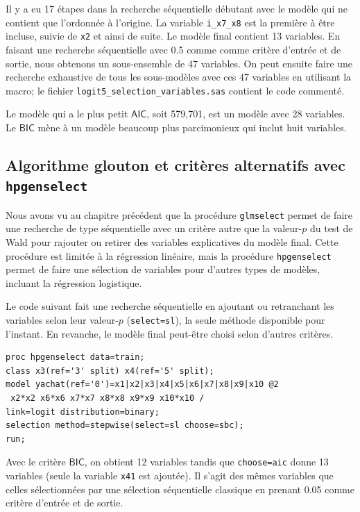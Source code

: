 \documentclass[
  11pt,
  letterpaper,
]{book}
\theoremstyle{definition}
\theoremstyle{definition}
\theoremstyle{definition}
\theoremstyle{remark}
\begin{document}
Il y a eu 17 étapes dans la recherche séquentielle débutant avec le modèle qui ne contient que l'ordonnée à l'origine. La variable \texttt{i\_x7\_x8} est la première à être incluse, suivie de \texttt{x2} et ainsi de suite. Le modèle final contient 13 variables.
En faisant une recherche séquentielle avec 0.5 comme comme critère d'entrée et de sortie, nous obtenons un sous-ensemble de 47 variables. On peut ensuite faire une recherche exhaustive de tous les sous-modèles avec ces 47 variables en utilisant la macro; le fichier \texttt{logit5\_selection\_variables.sas} contient le code commenté.

Le modèle qui a le plus petit \(\mathsf{AIC}\), soit 579,701, est un modèle avec 28 variables. Le \(\mathsf{BIC}\) mène à un modèle beaucoup plus parcimonieux qui inclut huit variables.

\hypertarget{algorithme-glouton-et-crituxe8res-alternatifs-avec-hpgenselect}{%
\subsection{\texorpdfstring{Algorithme glouton et critères alternatifs avec \texttt{hpgenselect}}{Algorithme glouton et critères alternatifs avec hpgenselect}}\label{algorithme-glouton-et-crituxe8res-alternatifs-avec-hpgenselect}}

Nous avons vu au chapitre précédent que la procédure \texttt{glmselect} permet de faire une recherche de type séquentielle avec un critère autre que la valeur-\(p\) du test de Wald pour rajouter ou retirer des variables explicatives du modèle final. Cette procédure est limitée à la régression linéaire, mais la procédure \texttt{hpgenselect} permet de faire une sélection de variables pour d'autres types de modèles, incluant la régression logistique.

Le code suivant fait une recherche séquentielle en ajoutant ou retranchant les variables selon leur valeur-\(p\) (\texttt{select=sl}), la seule méthode disponible pour l'instant. En revanche, le modèle final peut-être choisi selon d'autres critères.

\begin{verbatim}
proc hpgenselect data=train;
class x3(ref='3' split) x4(ref='5' split);
model yachat(ref='0')=x1|x2|x3|x4|x5|x6|x7|x8|x9|x10 @2 
 x2*x2 x6*x6 x7*x7 x8*x8 x9*x9 x10*x10 /  
link=logit distribution=binary;
selection method=stepwise(select=sl choose=sbc);
run;
\end{verbatim}

Avec le critère \(\mathsf{BIC}\), on obtient 12 variables tandis que \texttt{choose=aic} donne 13 variables (seule la variable \texttt{x41} est ajoutée). Il s'agit des mêmes variables que celles sélectionnées par une sélection séquentielle classique en prenant 0.05 comme critère d'entrée et de sortie.
\end{document}
